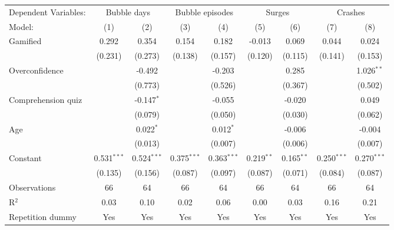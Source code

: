 \begin{tabular}{lcccccccc}
   \tabularnewline \midrule \midrule
   Dependent Variables: & \multicolumn{2}{c}{Bubble days} & \multicolumn{2}{c}{Bubble episodes} & \multicolumn{2}{c}{Surges} & \multicolumn{2}{c}{Crashes}\\
   Model:             & (1)           & (2)           & (3)           & (4)           & (5)          & (6)          & (7)           & (8)\\  
   \midrule
   Gamified           & 0.292         & 0.354         & 0.154         & 0.182         & -0.013       & 0.069        & 0.044         & 0.024\\   
                      & (0.231)       & (0.273)       & (0.138)       & (0.157)       & (0.120)      & (0.115)      & (0.141)       & (0.153)\\   
   Overconfidence     &               & -0.492        &               & -0.203        &              & 0.285        &               & 1.026$^{**}$\\   
                      &               & (0.773)       &               & (0.526)       &              & (0.367)      &               & (0.502)\\   
   Comprehension quiz &               & -0.147$^{*}$  &               & -0.055        &              & -0.020       &               & 0.049\\   
                      &               & (0.079)       &               & (0.050)       &              & (0.030)      &               & (0.062)\\   
   Age                &               & 0.022$^{*}$   &               & 0.012$^{*}$   &              & -0.006       &               & -0.004\\   
                      &               & (0.013)       &               & (0.007)       &              & (0.006)      &               & (0.007)\\   
   Constant           & 0.531$^{***}$ & 0.524$^{***}$ & 0.375$^{***}$ & 0.363$^{***}$ & 0.219$^{**}$ & 0.165$^{**}$ & 0.250$^{***}$ & 0.270$^{***}$\\   
                      & (0.135)       & (0.156)       & (0.087)       & (0.097)       & (0.087)      & (0.071)      & (0.084)       & (0.087)\\   
   \midrule
   Observations       & 66            & 64            & 66            & 64            & 66           & 64           & 66            & 64\\  
   R$^2$              & 0.03          & 0.10          & 0.02          & 0.06          & 0.00         & 0.03         & 0.16          & 0.21\\  
   Repetition dummy   & Yes           & Yes           & Yes           & Yes           & Yes          & Yes          & Yes           & Yes\\  
   \midrule \midrule
\end{tabular}
